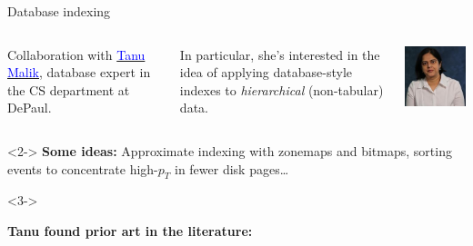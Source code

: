 \documentclass{beamer}
\begin{document}
\begin{frame}{Database indexing}
\vspace{0.5 cm}
\begin{columns}[c]
Collaboration with \href{http://www.cdm.depaul.edu/about/Pages/People/facultyinfo.aspx?fid=1328}{\textcolor{blue}{Tanu Malik}}, database expert in the CS department at DePaul.

\vspace{0.2 cm}
In particular, she's interested in the idea of applying database-style indexes to {\it hierarchical} (non-tabular) data.

\includegraphics[width=\linewidth]{tanu.jpg}
\end{columns}

\vspace{0.5 cm}
\begin{uncoverenv}<2->
{\bf Some ideas:}
Approximate indexing with zonemaps and bitmaps, sorting events to concentrate high-$p_T$ in fewer disk pages\ldots
\end{uncoverenv}

\vspace{0.5 cm}
\begin{uncoverenv}<3->
\begin{minipage}{\linewidth}
{\bf Tanu found prior art in the literature:}


\end{minipage}
\end{uncoverenv}
\end{frame}
\end{document}
